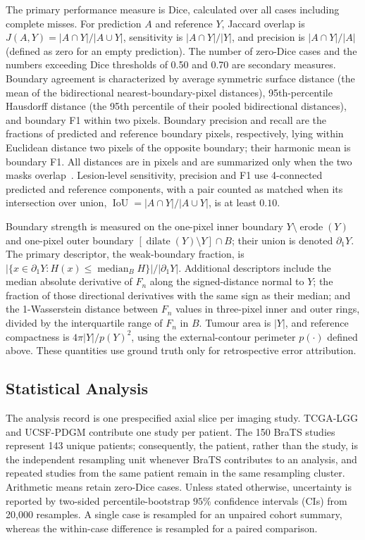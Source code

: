 \documentclass[11pt,a4paper]{article}
\begin{document}
The primary performance measure is Dice, calculated over all cases including
complete misses. For prediction $A$ and reference $Y$, Jaccard overlap is
$J(A,Y)=|A\cap Y|/|A\cup Y|$, sensitivity is $|A\cap Y|/|Y|$, and precision is
$|A\cap Y|/|A|$ (defined as zero for an empty prediction). The number of
zero-Dice cases and the numbers exceeding Dice thresholds of 0.50 and 0.70 are
secondary measures. Boundary agreement is characterized by average symmetric
surface distance (the mean of the bidirectional nearest-boundary-pixel
distances), 95th-percentile Hausdorff distance (the 95th percentile of their
pooled bidirectional distances), and boundary F1 within two pixels. Boundary
precision and recall are the fractions of predicted and reference boundary
pixels, respectively, lying within Euclidean distance two pixels of the opposite
boundary; their harmonic mean is boundary F1. All distances are in pixels and
are summarized only when the two masks overlap~\cite{taha2015}. Lesion-level
sensitivity, precision and F1 use 4-connected predicted and reference components,
with a pair counted as matched when its intersection over union,
$\operatorname{IoU}=|A\cap Y|/|A\cup Y|$, is at least $0.10$.

Boundary strength is measured on the one-pixel inner boundary
$Y\setminus\operatorname{erode}(Y)$ and one-pixel outer boundary
$[\operatorname{dilate}(Y)\setminus Y]\cap B$; their union is denoted
$\partial_1Y$. The primary descriptor, the weak-boundary fraction, is
$|\{x\in\partial_1Y:H(x)\le\operatorname{median}_{B}H\}|/|\partial_1Y|$.
Additional descriptors include the median absolute derivative of $F_n$ along
the signed-distance normal to $Y$; the fraction of those directional derivatives
with the same sign as their median; and the 1-Wasserstein distance between $F_n$
values in three-pixel inner and outer rings, divided by the interquartile range
of $F_n$ in $B$. Tumour area is $|Y|$, and reference compactness is
$4\pi|Y|/p(Y)^2$, using the external-contour perimeter $p(\cdot)$ defined above.
These quantities use ground truth only for retrospective error
attribution.

\subsection{Statistical Analysis}\label{sec:statistics}

The analysis record is one prespecified axial slice per imaging study. TCGA-LGG
and UCSF-PDGM contribute one study per patient. The 150 BraTS studies represent
143 unique patients; consequently, the patient, rather than the study, is the
independent resampling unit whenever BraTS contributes to an analysis, and
repeated studies from the same patient remain in the same resampling cluster.
Arithmetic means retain zero-Dice cases. Unless stated otherwise, uncertainty is
reported by two-sided percentile-bootstrap $95\%$ confidence intervals (CIs)
from 20,000 resamples. A single case is resampled for an unpaired cohort summary,
whereas the within-case difference is resampled for a paired comparison.
\end{document}
